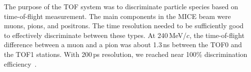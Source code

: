 

The purpose of the TOF system was to discriminate particle species
based on time-of-flight measurement. The main components in the
MICE beam were muons, pions, and positrons. The time resolution needed
to be sufficiently good to effectively discriminate between these
types. At 240\,MeV/$c$, the time-of-flight difference between a muon and
a pion was about 1.3\,ns between the TOF0 and the TOF1 stations. With 200\,ps
resolution, we reached near 100\% discrimination efficiency~\cite{Bogomilov:2012sr}.



